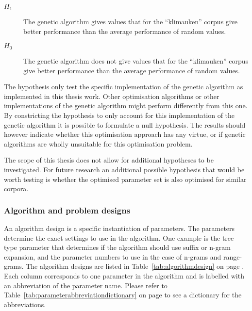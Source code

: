 	\begin{description}
	\item [\(H_{1}\)] The genetic algorithm gives values that for the ``klimauken'' corpus give better performance than the average performance of random values.
	\item [\(H_{0}\)] The genetic algorithm does not give values that for the ``klimauken'' corpus give better performance than the average performance of random values.
	\end{description}

The hypothesis only test the specific implementation of the genetic algorithm as implemented in this thesis work. Other optimisation algorithms or other implementations of the genetic algorithm might perform differently from this one. By constricting the hypothesis to only account for this implementation of the genetic algorithm it is possible to formulate a null hypothesis. The results should however indicate whether this optimisation approach has any virtue, or if genetic algorithms are wholly unsuitable for this optimisation problem.

The scope of this thesis does not allow for additional hypotheses to be investigated. For future research an additional possible hypothesis that would be worth testing is whether the optimised parameter set is also optimised for similar corpora.

\subsubsection{Algorithm and problem designs}
An algorithm design is a specific instantiation of parameters. The parameters determine the exact settings to use in the algorithm. One example is the tree type parameter that determines if the algorithm should use suffix or n-gram expansion, and the parameter numbers to use in the case of n-grams and range-grams. The algorithm designs are listed in Table~\ref{tab:algorithmdesign} on page \pageref{tab:algorithmdesign}. Each column corresponds to one parameter in the algorithm and is labelled with an abbreviation of the parameter name. Please refer to Table~\ref{tab:parameterabbreviationdictionary} on page \pageref{tab:parameterabbreviationdictionary} to see a dictionary for the abbreviations.


